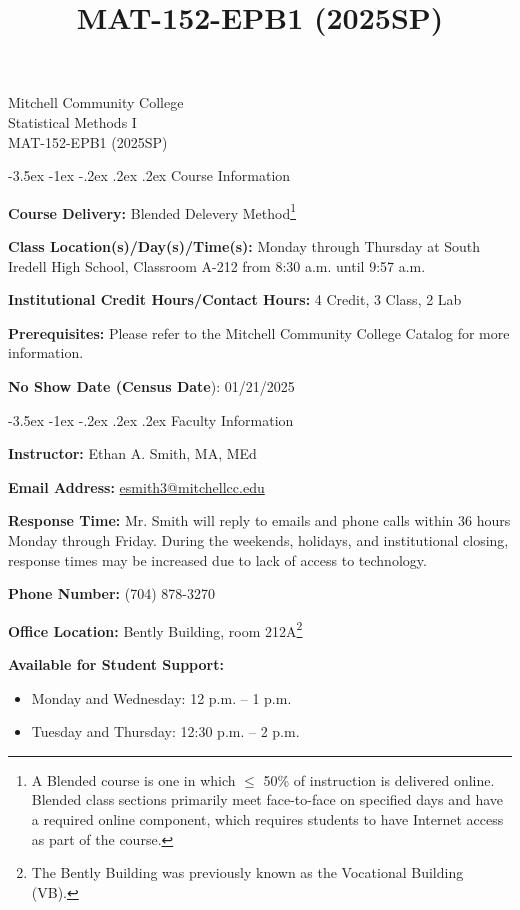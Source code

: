 \documentclass[11pt]{article}
\title{MAT-152-EPB1 (2025SP)}
\makeatletter
\renewcommand\section{\@startsection{section}{1}{0pt}%
  {-3.5ex \@plus -1ex \@minus -.2ex}%
  {.2ex \@plus.2ex}%
  {\normalfont\Large\bfseries}} %
\makeatother
\begin{document}
\begin{center}
    {\huge Mitchell Community College} \\[6pt]
    {\Large Statistical Methods I} \\[6pt]
    {\Large MAT-152-EPB1 (2025SP)}
\end{center}

\section{Course Information}

\textbf{Course Delivery:} Blended Delevery Method\footnote{A Blended course is one in which $\leq$ 50\% of instruction is delivered online. Blended class sections primarily meet face-to-face on specified days and have a required online component, which requires students to have Internet access as part of the course.}

\textbf{Class Location(s)/Day(s)/Time(s):} Monday through Thursday at South Iredell High School, Classroom A-212 from 8:30 a.m. until 9:57 a.m.

\textbf{Institutional Credit Hours/Contact Hours:} 4 Credit, 3 Class, 2 Lab

\textbf{Prerequisites:} Please refer to the Mitchell Community College Catalog for more information.

\textbf{No Show Date (Census Date}): 01/21/2025

\section{Faculty Information}

\textbf{Instructor:} Ethan A. Smith, MA, MEd

\textbf{Email Address:} \href{mailto:esmith3@mitchellcc.edu}{esmith3@mitchellcc.edu}

\textbf{Response Time:} Mr. Smith will reply to emails and phone calls within 36 hours Monday through Friday. During the weekends, holidays, and institutional closing, response times may be increased due to lack of access to technology.

\textbf{Phone Number:} (704) 878-3270

\textbf{Office Location:} Bently Building, room 212A\footnote{The Bently Building was previously known as the Vocational Building (VB).}

\textbf{Available for Student Support:}

\begin{itemize}
\item Monday and Wednesday: 12 p.m. -- 1 p.m.
\item Tuesday and Thursday: 12:30 p.m. -- 2 p.m.
\end{itemize}
\end{document}
